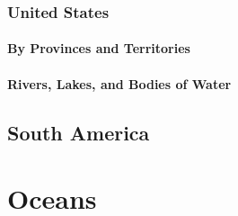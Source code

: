 		\subsubsection{United States}
			\paragraph{By Provinces and Territories}
			\paragraph{Rivers, Lakes, and Bodies of Water}
		
			
	\subsection{South America}


	\section{Oceans}
